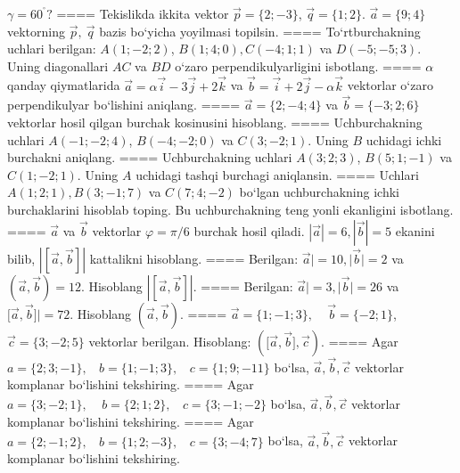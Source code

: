 $\gamma = 60^{{^\circ}}?$
====
Tekislikda ikkita vektor
$\overrightarrow{p} = \{ 2; - 3\}$, $\overrightarrow{q} = \{ 1;2\}$.
$\overrightarrow{a} = \{9;4\}$ vektorning
$\overrightarrow{p},\ \overrightarrow{q}$ bazis bo‘yicha yoyilmasi topilsin.
====
To‘rtburchakning uchlari berilgan:
$A (1; - 2;2) $, $B (1;4;0),C (- 4;1;1) $ va $D (- 5; -5;3) $. Uning diagonallari $AC$ va $BD$ o‘zaro
perpendikulyarligini isbotlang.
====
$\alpha$
qanday qiymatlarida 
$\overrightarrow{a} = \alpha\overrightarrow{i} - 3\overrightarrow{j} + 2\overrightarrow{k}$
va
$\overrightarrow{b} = \overrightarrow{i} + 2\overrightarrow{j} - \alpha\overrightarrow{k}$
vektorlar o‘zaro perpendikulyar bo‘lishini aniqlang.
====
$\overrightarrow{a} = \{ 2; - 4;4\}$ va $\overrightarrow{b} = \{ - 3;2;6\}$
vektorlar hosil qilgan burchak kosinusini hisoblang.
====
Uchburchakning uchlari
$A (- 1; - 2;4) $, $B (- 4; - 2;0) $ va $C (3; -2;1) $. Uning $B$ uchidagi
ichki burchakni aniqlang.
====
Uchburchakning uchlari
$A (3;2; 3) $, $B (5;1; - 1) $ va $C (1; -2;1) $. Uning $A$ uchidagi tashqi burchagi aniqlansin.
====
Uchlari $A (1;2;1), B (3;-1;7) $ va $C (7;4;-2) $ bo‘lgan uchburchakning
ichki burchaklarini hisoblab toping. Bu uchburchakning teng yonli ekanligini isbotlang.
====
$\overrightarrow{a}$ va $\overrightarrow{b}$ vektorlar
$\varphi = \pi/6$ burchak hosil qiladi.
$|\overrightarrow{a}| = 6,|\overrightarrow{b}| = 5$ ekanini bilib,
$\left| \left\lbrack \overrightarrow{a},\overrightarrow{b} \right\rbrack \right|$ kattalikni hisoblang.
====
Berilgan: $\overrightarrow{a}| = 10,|\overrightarrow{b}| = 2$ va
$\left(\overrightarrow{a},\overrightarrow{b} \right) = 12$. Hisoblang
$\left| \left\lbrack \overrightarrow{a},\overrightarrow{b} \right\rbrack \right|$.
====
Berilgan: $\overrightarrow{a}| = 3,|\overrightarrow{b}| = 26$ va
$\lbrack\overrightarrow{a},\overrightarrow{b}\rbrack| = 72$. Hisoblang
$\left(\overrightarrow{a},\overrightarrow{b} \right) $.
====
$\overrightarrow{a}
= \{ 1; - 1;3\}, \ \ \ \ \ \overrightarrow{b} = \{ - 2;1\}$, $\overrightarrow{c} = \{3; -2;5\}$ vektorlar berilgan. Hisoblang:
$ (\lbrack\overrightarrow{a},\overrightarrow{b}\rbrack,\overrightarrow{c}) $.
====
Agar \(a = \{ 2;3; - 1\}, \ \ \ \ b = \{ 1; - 1;3\}, \ \ \ \ c = \{ 1;9; - 11\}\) bo‘lsa, $\overrightarrow{a}, \overrightarrow{b}, \overrightarrow{c}$ vektorlar komplanar bo‘lishini tekshiring.
====
Agar \(a = \{ 3; - 2;1\},\ \ \ \ \ b = \{ 2;1;2\},\ \ \ \ c = \{ 3; - 1; - 2\}\) bo‘lsa, $\overrightarrow{a}, \overrightarrow{b}, \overrightarrow{c}$ vektorlar komplanar bo‘lishini tekshiring.
====
Agar \(a = \{ 2; - 1;2\}, \ \ \ \ b = \{ 1;2; - 3\}, \ \ \ \ c = \{ 3; - 4;7\}\) bo‘lsa, $\overrightarrow{a}, \overrightarrow{b}, \overrightarrow{c}$ vektorlar komplanar bo‘lishini tekshiring.
